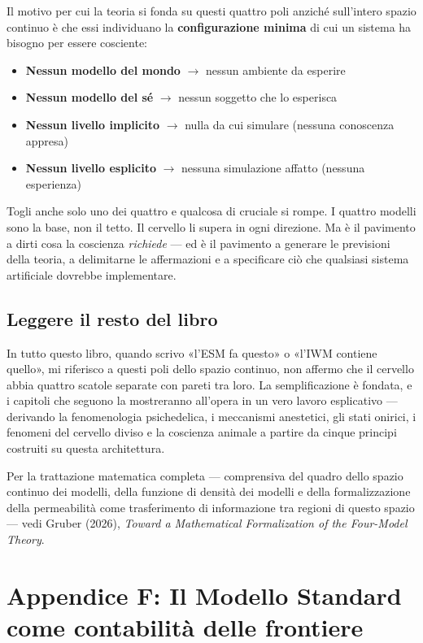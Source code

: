 \documentclass[11pt, twoside, openright]{book}
\begin{document}
Il motivo per cui la teoria si fonda su questi quattro poli anziché sull'intero spazio continuo è che essi individuano la \textbf{configurazione minima} di cui un sistema ha bisogno per essere cosciente:

\begin{itemize}
  \item \textbf{Nessun modello del mondo} $\rightarrow$ nessun ambiente da esperire
  \item \textbf{Nessun modello del sé} $\rightarrow$ nessun soggetto che lo esperisca
  \item \textbf{Nessun livello implicito} $\rightarrow$ nulla da cui simulare (nessuna conoscenza appresa)
  \item \textbf{Nessun livello esplicito} $\rightarrow$ nessuna simulazione affatto (nessuna esperienza)
\end{itemize}

Togli anche solo uno dei quattro e qualcosa di cruciale si rompe. I quattro modelli sono la base, non il tetto. Il cervello li supera in ogni direzione. Ma è il pavimento a dirti cosa la coscienza \textit{richiede} --- ed è il pavimento a generare le previsioni della teoria, a delimitarne le affermazioni e a specificare ciò che qualsiasi sistema artificiale dovrebbe implementare.

\section*{Leggere il resto del libro}

In tutto questo libro, quando scrivo «l'ESM fa questo» o «l'IWM contiene quello», mi riferisco a questi poli dello spazio continuo, non affermo che il cervello abbia quattro scatole separate con pareti tra loro. La semplificazione è fondata, e i capitoli che seguono la mostreranno all'opera in un vero lavoro esplicativo --- derivando la fenomenologia psichedelica, i meccanismi anestetici, gli stati onirici, i fenomeni del cervello diviso e la coscienza animale a partire da cinque principi costruiti su questa architettura.

Per la trattazione matematica completa --- comprensiva del quadro dello spazio continuo dei modelli, della funzione di densità dei modelli e della formalizzazione della permeabilità come trasferimento di informazione tra regioni di questo spazio --- vedi Gruber (2026), \textit{Toward a Mathematical Formalization of the Four-Model Theory}.


\chapter*{Appendice F: Il Modello Standard come contabilità delle frontiere}
\end{document}
